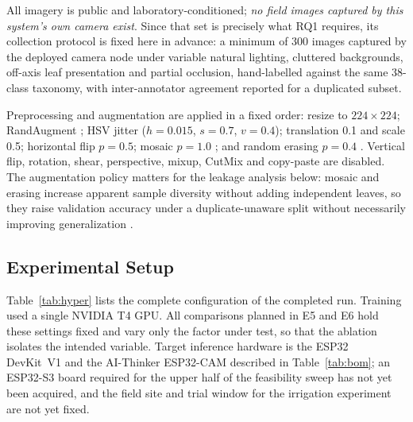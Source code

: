 \documentclass[journal]{IEEEtran}
\begin{document}
All imagery is public and laboratory-conditioned; \emph{no field images
captured by this system's own camera exist}. Since that set is precisely
what RQ1 requires, its collection protocol is fixed here in advance: a
minimum of 300 images captured by the deployed camera node under variable
natural lighting, cluttered backgrounds, off-axis leaf presentation and
partial occlusion, hand-labelled against the same 38-class taxonomy, with
inter-annotator agreement reported for a duplicated subset.

Preprocessing and augmentation are applied in a fixed order: resize to
$224\times224$; RandAugment \cite{cubuk2020randaugment}; HSV jitter
($h{=}0.015$, $s{=}0.7$, $v{=}0.4$); translation 0.1 and scale 0.5;
horizontal flip $p{=}0.5$; mosaic $p{=}1.0$ \cite{bochkovskiy2020yolov4};
and random erasing $p{=}0.4$ \cite{zhong2020randomerasing}. Vertical flip,
rotation, shear, perspective, mixup, CutMix and copy-paste are disabled.
The augmentation policy matters for the leakage analysis below: mosaic and
erasing increase apparent sample diversity without adding independent
leaves, so they raise validation accuracy under a duplicate-unaware split
without necessarily improving generalization \cite{shorten2019survey}.

\subsection{Experimental Setup}

Table~\ref{tab:hyper} lists the complete configuration of the completed
run. Training used a single NVIDIA T4 GPU. All comparisons planned in E5
and E6 hold these settings fixed and vary only the factor under test, so
that the ablation isolates the intended variable. Target inference hardware
is the ESP32 DevKit~V1 and the AI-Thinker ESP32-CAM described in
Table~\ref{tab:bom}; an ESP32-S3 board required for the upper half of the
feasibility sweep has not yet been acquired, and the field site and trial
window for the irrigation experiment are not yet fixed.
\end{document}
